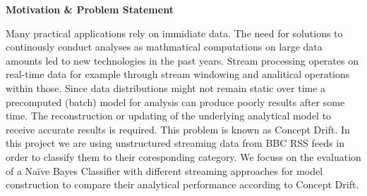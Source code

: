 \begin{center} \textbf{\huge Motivation \& Problem Statement} \end{center}
Many practical applications rely on immidiate data. The need for solutions to continously conduct analyses as mathmatical computations on large data amounts led to new technologies in the past years. Stream processing operates on real-time data for example through stream windowing and analitical operations within those. Since data distributions might not remain static over time a precomputed (batch) model for analysis can produce poorly results after some time. The reconstruction or updating of the underlying analytical model to receive accurate results is required. This problem is known as Concept Drift. In this project we are using unstructured streaming data from BBC RSS feeds in order to classify them to their coresponding category. We focuss on the evaluation of a Na\"ive Bayes Classifier with different streaming approaches for model construction to compare their analytical performance according to Concept Drift. 